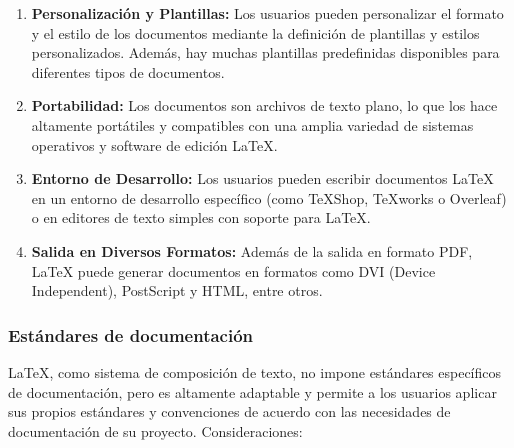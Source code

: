 \documentclass[letterpaper]{article}
\begin{document}
\begin{enumerate}[series=listWWNumxvii,label=\arabic*.,ref=\arabic*]
\item \textbf{Personalización y Plantillas:} Los usuarios pueden personalizar el formato y el estilo de los documentos
mediante la definición de plantillas y estilos personalizados. Además, hay muchas plantillas predefinidas disponibles
para diferentes tipos de documentos.
\item \textbf{Portabilidad:} Los documentos son archivos de texto plano, lo que los hace altamente portátiles y
compatibles con una amplia variedad de sistemas operativos y software de edición LaTeX.
\item \textbf{Entorno de Desarrollo:} Los usuarios pueden escribir documentos LaTeX en un entorno de desarrollo
específico (como TeXShop, TeXworks o Overleaf) o en editores de texto simples con soporte para LaTeX.
\item \textbf{Salida en Diversos Formatos:} Además de la salida en formato PDF, LaTeX puede generar documentos en
formatos como DVI (Device Independent), PostScript y HTML, entre otros.
\end{enumerate}
\subsubsection{Estándares de documentación}
LaTeX, como sistema de composición de texto, no impone estándares específicos de documentación, pero es altamente
adaptable y permite a los usuarios aplicar sus propios estándares y convenciones de acuerdo con las necesidades de
documentación de su proyecto. Consideraciones:
\end{document}
